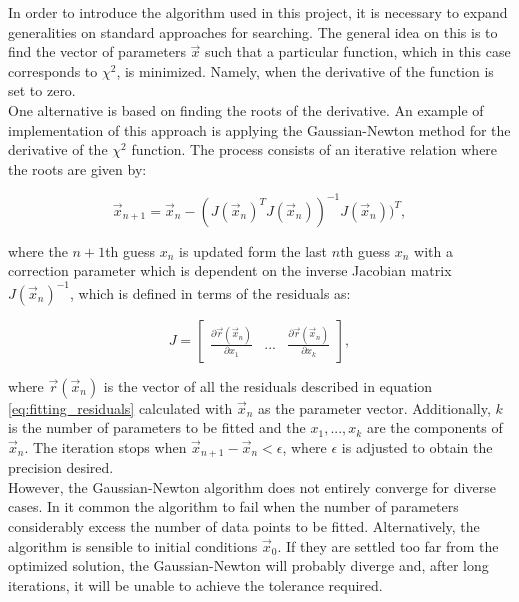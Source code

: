 \documentclass[openany]{book}
\begin{document}
In order to introduce the algorithm used in this project, it is necessary to expand generalities on standard approaches for searching. The general idea on this is to find the vector of parameters $\vec x$ such that a particular function, which in this case corresponds to $\chi^2$, is minimized. Namely, when the derivative of the function is set to zero. \\

One alternative is based on finding the roots of the derivative. An example of implementation of this approach is applying the Gaussian-Newton method for the derivative of the $\chi^2$ function. The process consists of an iterative relation where the roots are given by:

\begin{equation}\label{eq:fitting_GaussianNewton}
	\vec x_{n+1} = \vec x_{n}  - (J(\vec x_n)^{T} J(\vec x_n))^{-1} J(\vec x_n))^{T},
\end{equation}

where the $n+1$th guess $x_n$ is updated form the last $n$th guess $x_n$ with a correction parameter which is dependent on the inverse Jacobian matrix $J(\vec x_n)^{-1}$, which is defined in terms of the residuals as:

\begin{equation}\label{eq:fitting_Jacobian}
	J  = \left[ \begin{array}{ccc}
		\frac{\partial \vec r(\vec x_n) }{\partial x_1  } & ... &  	\frac{\partial  \vec r(\vec x_n) }{\partial x_k}
	\end{array} \right], 
\end{equation}

where $\vec r(\vec x_n) $ is the vector of all the residuals described in equation \ref{eq:fitting_residuals} calculated with $\vec x_n$ as the parameter vector. Additionally,  $k$ is the number of parameters to be fitted and the $x_1,..., x_k$ are the components of $\vec x_n$.  The iteration stops when $\vec x_{n+1}   - \vec x_n < \epsilon$, where $\epsilon$ is adjusted to obtain the precision desired. \\

However,  the Gaussian-Newton algorithm does not entirely converge for diverse cases. In it common the algorithm to fail when the number of parameters  considerably excess the number of data points to be fitted. Alternatively, the algorithm is sensible to initial conditions $\vec x_0$. If they are settled too far from the optimized solution, the Gaussian-Newton will probably diverge and, after long iterations, it will be unable to achieve the tolerance required.  \\
\end{document}
